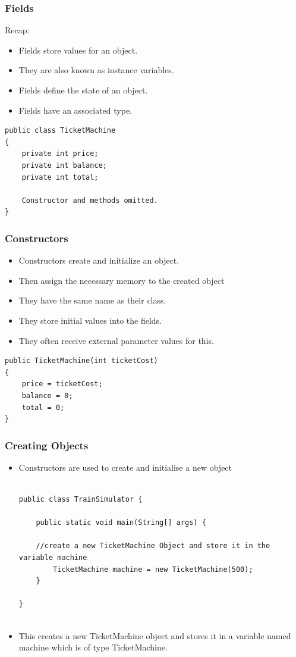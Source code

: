 \documentclass{beamer}
\begin{document}
\begin{frame}[fragile]
\frametitle{Fields}
Recap:
\begin{itemize}
\item \alert{Fields} store values for an object.
\item They are also known as \alert{instance variables}.
\item Fields define the \alert{state} of an object.
\item Fields have an associated \alert{type}.
\end{itemize}

\begin{lstlisting}
public class TicketMachine
{
    private int price;
    private int balance;
    private int total;
 
    Constructor and methods omitted.
} 
\end{lstlisting}
\end{frame}

\begin{frame}[fragile]
\frametitle{Constructors}
\begin{itemize}
\item Constructors create and initialize an object.
\item Then assign the necessary memory to the created object
\item They have the same name as their class.
\item They store initial values into the fields.
\item They often receive external parameter values for this.
\end{itemize}

\begin{lstlisting}
public TicketMachine(int ticketCost)‏
{
    price = ticketCost;
    balance = 0;
    total = 0;
} 
\end{lstlisting}
\end{frame}

\begin{frame}[fragile]
\frametitle{Creating Objects}
\begin{itemize}
\item Constructors are used to create and initialise a new object
\tiny
\begin{lstlisting}

public class TrainSimulator {

    public static void main(String[] args) {
        
	//create a new TicketMachine Object and store it in the variable machine
        TicketMachine machine = new TicketMachine(500);
    }

}


\end{lstlisting}
\item This creates a new TicketMachine object and stores it in a variable named machine which is
of type TicketMachine.
\end{itemize}
\end{frame}
\end{document}
